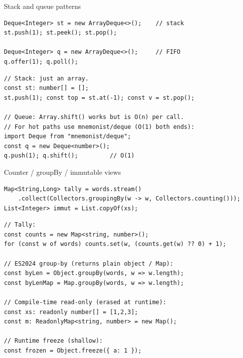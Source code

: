\documentclass[10pt]{article}
\begin{document}
\begin{construct}{Stack and queue patterns}
\noindent
\begin{minipage}[t]{0.485\linewidth}
\begin{lstlisting}[style=java, title=Java]
Deque<Integer> st = new ArrayDeque<>();    // stack
st.push(1); st.peek(); st.pop();

Deque<Integer> q = new ArrayDeque<>();     // FIFO
q.offer(1); q.poll();
\end{lstlisting}
\end{minipage}\hfill
\begin{minipage}[t]{0.485\linewidth}
\begin{lstlisting}[style=ts, title=TypeScript]
// Stack: just an array.
const st: number[] = [];
st.push(1); const top = st.at(-1); const v = st.pop();

// Queue: Array.shift() works but is O(n) per call.
// For hot paths use mnemonist/deque (O(1) both ends):
import Deque from "mnemonist/deque";
const q = new Deque<number>();
q.push(1); q.shift();         // O(1)
\end{lstlisting}
\end{minipage}
\end{construct}


\begin{construct}{Counter / groupBy / immutable views}
\noindent
\begin{minipage}[t]{0.485\linewidth}
\begin{lstlisting}[style=java, title=Java]
Map<String,Long> tally = words.stream()
    .collect(Collectors.groupingBy(w -> w, Collectors.counting()));
List<Integer> immut = List.copyOf(xs);
\end{lstlisting}
\end{minipage}\hfill
\begin{minipage}[t]{0.485\linewidth}
\begin{lstlisting}[style=ts, title=TypeScript]
// Tally:
const counts = new Map<string, number>();
for (const w of words) counts.set(w, (counts.get(w) ?? 0) + 1);

// ES2024 group-by (returns plain object / Map):
const byLen = Object.groupBy(words, w => w.length);
const byLenMap = Map.groupBy(words, w => w.length);

// Compile-time read-only (erased at runtime):
const xs: readonly number[] = [1,2,3];
const m: ReadonlyMap<string, number> = new Map();

// Runtime freeze (shallow):
const frozen = Object.freeze({ a: 1 });
\end{lstlisting}
\end{minipage}
\end{construct}
\end{document}
